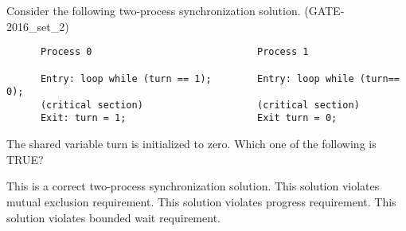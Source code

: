 
\begin{questyle}

  \question  Consider the following two-process synchronization solution. (GATE- 2016\_set\_2)

  \begin{lstlisting}
      Process 0                             Process 1

      Entry: loop while (turn == 1);        Entry: loop while (turn== 0);
      (critical section)                    (critical section)
      Exit: turn = 1;                       Exit turn = 0;
  \end{lstlisting}
  The shared variable turn is initialized to zero. Which one of the following is TRUE?

  \begin{choices}
    \choice  This is a correct two-process synchronization solution.
    \choice  This solution violates mutual exclusion requirement.
    \CorrectChoice  This solution violates progress requirement.
    \choice  This solution violates bounded wait requirement.
  \end{choices}

  \end{questyle}














\begin{comment}

\begin{questyle}

  \question  (GATE- )

  \begin{choices}
    \choice
    \choice
    \choice
    \choice
  \end{choices}

  \end{questyle}





\end{comment}
